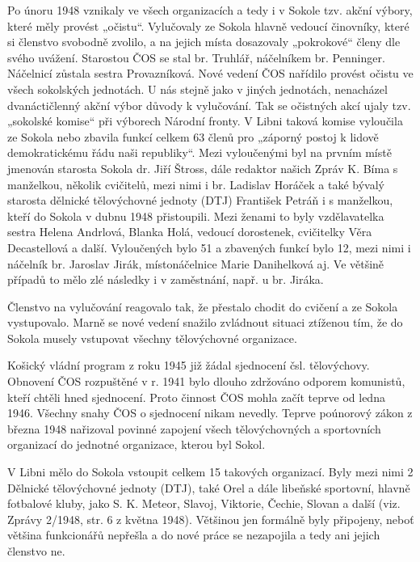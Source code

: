Po únoru 1948 vznikaly ve všech organizacích a tedy i v Sokole tzv.
akční výbory, které měly provést „očistu``. Vylučovaly ze Sokola hlavně
vedoucí činovníky, které si členstvo svobodně zvolilo, a na jejich místa
dosazovaly „pokrokové`` členy dle svého uvážení. Starostou ČOS se stal
br. Truhlář, náčelníkem br. Penninger. Náčelnicí zůstala sestra
Provazníková. Nové vedení ČOS nařídilo provést očistu ve všech
sokolských jednotách. U nás stejně jako v jiných jednotách, nenacházel
dvanáctičlenný akční výbor důvody k vylučování. Tak se očistných akcí
ujaly tzv. „sokolské komise`` při výborech Národní fronty. V Libni
taková komise vyloučila ze Sokola nebo zbavila funkcí celkem 63 členů
pro „záporný postoj k lidově demokratickému řádu naši republiky``. Mezi
vyloučenými byl na prvním místě jmenován starosta Sokola dr. Jiří
Štross, dále redaktor našich Zpráv K. Bíma s manželkou, několik
cvičitelů, mezi nimi i br. Ladislav Horáček a také bývalý starosta
dělnické tělovýchovné jednoty (DTJ) František Petráň i s manželkou,
kteří do Sokola v dubnu 1948 přistoupili. Mezi ženami to byly
vzdělavatelka sestra Helena Andrlová, Blanka Holá, vedoucí dorostenek,
cvičitelky Věra Decastellová a další. Vyloučených bylo 51 a zbavených
funkcí bylo 12, mezi nimi i náčelník br. Jaroslav Jirák, místonáčelnice
Marie Danihelková aj. Ve většině případů to mělo zlé následky i v
zaměstnání, např. u br. Jiráka.

Členstvo na vylučování reagovalo tak, že přestalo chodit do cvičení a ze
Sokola vystupovalo. Marně se nové vedení snažilo zvládnout situaci
ztíženou tím, že do Sokola musely vstupovat všechny tělovýchovné
organizace.

Košický vládní program z roku 1945 již žádal sjednocení čsl.
tělovýchovy. Obnovení ČOS rozpuštěné v r. 1941 bylo dlouho zdržováno
odporem komunistů, kteří chtěli hned sjednocení. Proto činnost ČOS mohla
začít teprve od ledna 1946. Všechny snahy ČOS o sjednocení nikam
nevedly. Teprve poúnorový zákon z března 1948 nařizoval povinné zapojení
všech tělovýchovných a sportovních organizací do jednotné organizace,
kterou byl Sokol.

V Libni mělo do Sokola vstoupit celkem 15 takových organizací. Byly mezi
nimi 2 Dělnické tělovýchovné jednoty (DTJ), také Orel a dále libeňské
sportovní, hlavně fotbalové kluby, jako S. K. Meteor, Slavoj, Viktorie,
Čechie, Slovan a další (viz. Zprávy 2/1948, str. 6 z května 1948).
Většinou jen formálně byly připojeny, neboť většina funkcionářů nepřešla
a do nové práce se nezapojila a tedy ani jejich členstvo ne.

